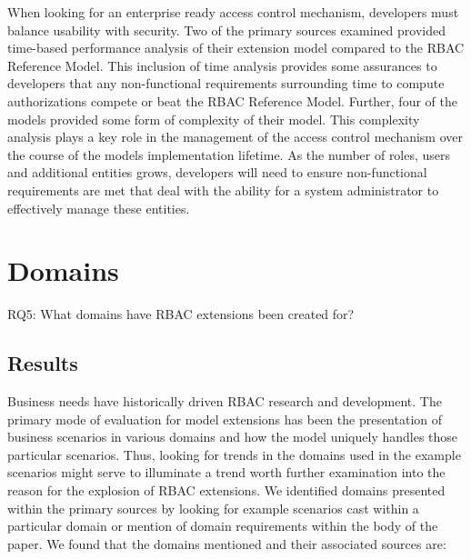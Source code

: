 When looking for an enterprise ready access control mechanism, developers must balance usability with security. 
Two of the primary sources examined provided time-based performance analysis of their extension model compared
to the RBAC Reference Model. This inclusion of time analysis provides some assurances to developers that any non-functional
requirements surrounding time to compute authorizations compete or beat the RBAC Reference Model. Further, four of the models provided
some form of complexity of their model. This complexity analysis plays a key role in the management of the access control mechanism
over the course of the models implementation lifetime. As the number of roles, users and additional entities grows, developers will 
need to ensure non-functional requirements are met that deal with the ability for a system administrator to effectively manage these
entities.


\section{Domains} \label{sec:domains}

RQ5: What domains have RBAC extensions been created for?

\subsection{Results}

Business needs have historically driven RBAC research and development.  The primary mode of evaluation for
model extensions has been the presentation of business scenarios in various domains and how the model
uniquely handles those particular scenarios.  Thus, looking for trends in the domains used in the example
scenarios might serve to illuminate a trend worth further examination into the reason for the explosion of
RBAC extensions.  We identified domains presented within the primary sources by looking for example
scenarios cast within a particular domain or mention of domain requirements within the body of the paper.
We found that the domains mentioned and their associated sources are:

